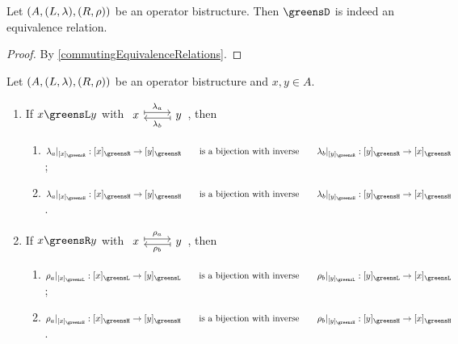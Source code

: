 \begin{corollary}
Let $\left( A, (L, \lambda), (R,\rho) \right)$ be an operator bistructure. Then $\greensD$ is indeed an equivalence relation.
\end{corollary}
\begin{proof}
By \ref{commutingEquivalenceRelations}.
\end{proof}

\begin{proposition} \label{GreensLemma}
Let $\left( A, (L, \lambda), (R,\rho) \right)$ be an operator bistructure and $x,y \in A$.
\begin{enumerate}
\item If $x\greensL y$ with $\begin{tikzcd}
x \ar[r, maps to, shift left, "\lambda_a"] & y \ar[l, maps to, shift left, "\lambda_b"]
\end{tikzcd}$, then
\begin{enumerate}
\item $\lambda_a|_{[x]_\greensR}: [x]_\greensR \to [y]_\greensR \qquad \text{is a bijection with inverse} \qquad \lambda_b|_{[y]_\greensR}: [y]_\greensR \to [x]_\greensR$;
\item $\lambda_a|_{[x]_\greensH}: [x]_\greensH \to [y]_\greensH \qquad \text{is a bijection with inverse} \qquad \lambda_b|_{[y]_\greensH}: [y]_\greensH \to [x]_\greensH$.
\end{enumerate}
\item If $x\greensR y$ with $\begin{tikzcd}
x \ar[r, maps to, shift left, "\rho_a"] & y \ar[l, maps to, shift left, "\rho_b"]
\end{tikzcd}$, then
\begin{enumerate}
\item $\rho_a|_{[x]_\greensL}: [x]_\greensL \to [y]_\greensL \qquad \text{is a bijection with inverse} \qquad \rho_b|_{[y]_\greensL}: [y]_\greensL \to [x]_\greensL$;
\item $\rho_a|_{[x]_\greensH}: [x]_\greensH \to [y]_\greensH \qquad \text{is a bijection with inverse} \qquad \rho_b|_{[y]_\greensH}: [y]_\greensH \to [x]_\greensH$.
\end{enumerate}
\end{enumerate}
\end{proposition}
